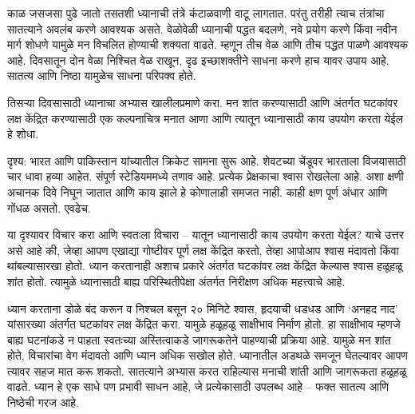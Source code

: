 काळ जसजसा पुढे जातो तसतशी ध्यानाची तंत्रे कंटाळवाणी वाटू लागतात. परंतु तरीही त्याच तंत्रांचा सातत्याने अवलंब करणे आवश्यक असते. वेळोवेळी ध्यानाची पद्धत बदलणे, नवे प्रयोग करणे किंवा नवीन मार्ग शोधणे यामुळे मन विचलित होण्याची शक्यता वाढते. म्हणून तीच वेळ आणि तीच पद्धत पाळणे आवश्यक आहे. दिवसातून दोन वेळा निश्चित वेळ राखून, दृढ इच्छाशक्तीने साधना करणे हाच यावर उपाय आहे. सातत्य आणि निष्ठा यामुळेच साधना परिपक्व होते.

तिसऱ्या दिवसासाठी ध्यानाचा अभ्यास खालीलप्रमाणे करा. मन शांत करण्यासाठी आणि अंतर्गत घटकांवर लक्ष केंद्रित करण्यासाठी एक कल्पनाचित्र मनात आणा आणि त्यातून ध्यानासाठी काय उपयोग करता येईल हे शोधा.

दृश्य: भारत आणि पाकिस्तान यांच्यातील क्रिकेट सामना सुरू आहे. शेवटच्या चेंडूवर भारताला विजयासाठी चार धावा हव्या आहेत. संपूर्ण स्टेडियममध्ये तणाव आहे. प्रत्येक प्रेक्षकाचा श्वास रोखलेला आहे. अशा क्षणी अचानक दिवे निघून जातात आणि काय झाले हे कोणालाही समजत नाही. काही क्षण पूर्ण अंधार आणि गोंधळ असतो. एवढेच.

या दृश्यावर विचार करा आणि स्वतःला विचारा – यातून ध्यानासाठी काय उपयोग करता येईल? याचे उत्तर असे आहे की, जेव्हा आपण एखाद्या गोष्टीवर पूर्ण लक्ष केंद्रित करतो, तेव्हा आपोआप श्वास मंदावतो किंवा थांबल्यासारखा होतो. ध्यान करतानाही अशाच प्रकारे अंतर्गत घटकांवर लक्ष केंद्रित केल्यास श्वास हळूहळू शांत होतो. त्यामुळे ध्यानासाठी बाह्य परिस्थितीपेक्षा अंतर्गत निरीक्षण अधिक महत्त्वाचे आहे.

ध्यान करताना डोळे बंद करून व निश्चल बसून २० मिनिटे श्वास, हृदयाची धडधड आणि ‘अनहद नाद’ यांसारख्या अंतर्गत घटकांवर लक्ष केंद्रित करा. यामुळे हळूहळू साक्षीभाव निर्माण होतो. हा साक्षीभाव म्हणजे बाह्य घटनांकडे न पाहता स्वतःच्या अस्तित्वाकडे जागरूकतेने पाहण्याची प्रक्रिया आहे. यामुळे मन शांत होते, विचारांचा वेग मंदावतो आणि ध्यान अधिक सखोल होते.
ध्यानातील अडथळे समजून घेतल्यावर आपण त्यावर सहज मात करू शकतो. सातत्याने अभ्यास करत राहिल्यास मनाची शांती आणि जागरूकता हळूहळू वाढते. ध्यान हे एक साधे पण प्रभावी साधन आहे, जे प्रत्येकासाठी उपलब्ध आहे – फक्त सातत्य आणि निष्ठेची गरज आहे.

